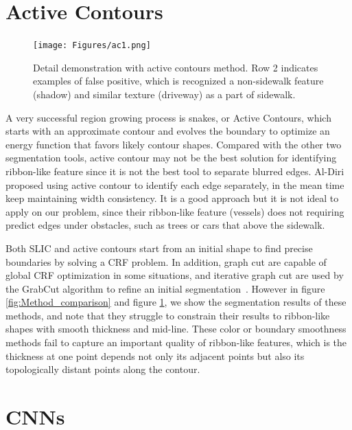 \section{Active Contours}

\begin{figure}[H]
    \centering
    \texttt{[image: Figures/ac1.png]}
    \caption[Example of Active Contours]{Detail demonstration with active contours method. Row 2 indicates examples of false positive, which is recognized a non-sidewalk feature (shadow) and similar texture (driveway) as a part of sidewalk.}
    \label{fig:ac}
\end{figure}

A very successful region growing process is snakes, or Active Contours, which starts with an approximate contour and evolves the boundary to optimize an energy function that favors likely contour shapes. 
Compared with the other two segmentation tools, active contour may not be the best solution for identifying ribbon-like feature since it is not the best tool to separate blurred edges. 
Al-Diri~\cite{ActiveContou09} proposed using active contour to identify each edge separately, in the mean time keep maintaining width consistency. 
It is a good approach but it is not ideal to apply on our problem, since their ribbon-like feature (vessels) does not requiring predict edges under obstacles, such as trees or cars that above the sidewalk.


Both \ac{SLIC} and active contours start from an initial shape to find precise boundaries by solving a \ac{CRF} problem. 
In addition, graph cut are capable of global \ac{CRF} optimization in some situations, and iterative graph cut are used by the GrabCut algorithm to refine an initial segmentation~\cite{Rother2004-ou}. However in figure \ref{fig:Method_comparison} and figure \ref{fig:ac}, we show the segmentation results of these methods, and note that they struggle to constrain their results to ribbon-like shapes with smooth thickness and mid-line.
These color or boundary smoothness methods fail to capture an important quality of ribbon-like features, which is the thickness at one point depends not only its adjacent points but also its topologically distant points along the contour.

\section{\ac{CNNs}}


